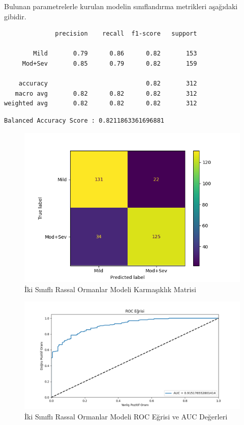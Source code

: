 \documentclass[12pt,twoside]{deuthesis}
\begin{document}
Bulunan parametrelerle kurulan modelin sınıflandırma metrikleri aşağıdaki gibidir.
\begin{verbatim}
              precision    recall  f1-score   support

        Mild       0.79      0.86      0.82       153
     Mod+Sev       0.85      0.79      0.82       159

    accuracy                           0.82       312
   macro avg       0.82      0.82      0.82       312
weighted avg       0.82      0.82      0.82       312
\end{verbatim}
\begin{verbatim}
Balanced Accuracy Score : 0.8211863361696881
\end{verbatim}
\begin{figure}

{\centering \includegraphics[width=1.05\linewidth,height=0.6\textheight]{figure/rf_bin_conf} 

}

\caption{İki Sınıflı Rassal Ormanlar Modeli Karmaşıklık Matrisi}\label{fig:unnamed-chunk-67}
\end{figure}
\begin{figure}

{\centering \includegraphics[width=1.05\linewidth,height=0.6\textheight]{figure/RandomForestClassifier_binary_roc} 

}

\caption{İki Sınıflı Rassal Ormanlar Modeli ROC Eğrisi ve AUC Değerleri}\label{fig:unnamed-chunk-68}
\end{figure}
\end{document}
